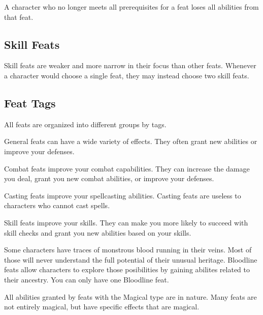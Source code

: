         A character who no longer meets all prerequisites for a feat loses all abilities from that feat.

    \subsection{Skill Feats}
        Skill feats are weaker and more narrow in their focus than other feats.
        Whenever a character would choose a single feat, they may instead choose two skill feats.

    \subsection{Feat Tags}
        All feats are organized into different groups by tags.

         General feats can have a wide variety of effects.
        They often grant new abilities or improve your defenses.

         Combat feats improve your combat capabilities.
        They can increase the damage you deal, grant you new combat abilities, or improve your defenses.

         Casting feats improve your spellcasting abilities.
        Casting feats are useless to characters who cannot cast spells.

         Skill feats improve your skills.
        They can make you more likely to succeed with skill checks and grant you new abilities based on your skills.

         Some characters have traces of monstrous blood running in their veins.
        Most of those will never understand the full potential of their unusual heritage.
        Bloodline feats allow characters to explore those posibilities by gaining abilites related to their ancestry.
        You can only have one Bloodline feat.

        All abilities granted by feats with the Magical type are  in nature.
        Many feats are not entirely magical, but have specific effects that are magical.

